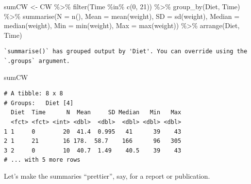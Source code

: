 \documentclass[
  letterpaper,
  DIV=11,
  numbers=noendperiod]{scrreprt}
\newenvironment{Shaded}{\begin{snugshade}}{\end{snugshade}}
\newcommand{\AttributeTok}[1]{\textcolor[rgb]{0.40,0.45,0.13}{#1}}
\newcommand{\DecValTok}[1]{\textcolor[rgb]{0.68,0.00,0.00}{#1}}
\newcommand{\FunctionTok}[1]{\textcolor[rgb]{0.28,0.35,0.67}{#1}}
\newcommand{\NormalTok}[1]{\textcolor[rgb]{0.00,0.23,0.31}{#1}}
\newcommand{\OtherTok}[1]{\textcolor[rgb]{0.00,0.23,0.31}{#1}}
\newcommand{\SpecialCharTok}[1]{\textcolor[rgb]{0.37,0.37,0.37}{#1}}
\theoremstyle{definition}
\theoremstyle{plain}
\theoremstyle{plain}
\theoremstyle{remark}
\begin{document}
\begin{Shaded}
\begin{Highlighting}[]
\NormalTok{sumCW }\OtherTok{\textless{}{-}}\NormalTok{  CW }\SpecialCharTok{\%\textgreater{}\%} 
  \FunctionTok{filter}\NormalTok{(Time }\SpecialCharTok{\%in\%} \FunctionTok{c}\NormalTok{(}\DecValTok{0}\NormalTok{, }\DecValTok{21}\NormalTok{)) }\SpecialCharTok{\%\textgreater{}\%} 
  \FunctionTok{group\_by}\NormalTok{(Diet, Time) }\SpecialCharTok{\%\textgreater{}\%} 
  \FunctionTok{summarise}\NormalTok{(}\AttributeTok{N =} \FunctionTok{n}\NormalTok{(),}
            \AttributeTok{Mean =} \FunctionTok{mean}\NormalTok{(weight),}
            \AttributeTok{SD =} \FunctionTok{sd}\NormalTok{(weight),}
            \AttributeTok{Median =} \FunctionTok{median}\NormalTok{(weight),}
            \AttributeTok{Min =} \FunctionTok{min}\NormalTok{(weight),}
            \AttributeTok{Max =} \FunctionTok{max}\NormalTok{(weight)) }\SpecialCharTok{\%\textgreater{}\%} 
  \FunctionTok{arrange}\NormalTok{(Diet, Time)}
\end{Highlighting}
\end{Shaded}

\begin{verbatim}
`summarise()` has grouped output by 'Diet'. You can override using the
`.groups` argument.
\end{verbatim}

\begin{Shaded}
\begin{Highlighting}[]
\NormalTok{sumCW}
\end{Highlighting}
\end{Shaded}

\begin{verbatim}
# A tibble: 8 x 8
# Groups:   Diet [4]
  Diet  Time      N  Mean     SD Median   Min   Max
  <fct> <fct> <int> <dbl>  <dbl>  <dbl> <dbl> <dbl>
1 1     0        20  41.4  0.995   41      39    43
2 1     21       16 178.  58.7    166      96   305
3 2     0        10  40.7  1.49    40.5    39    43
# ... with 5 more rows
\end{verbatim}

Let's make the summaries ``prettier'', say, for a report or publication.
\end{document}
